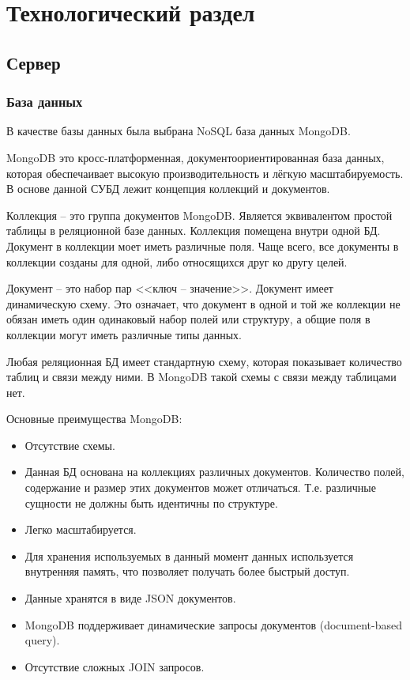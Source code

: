 \chapter{Технологический раздел}

\section{Сервер}

\subsection{База данных}
В качестве базы данных была выбрана NoSQL база данных MongoDB.

MongoDB это кросс-платформенная, документоориентированная база данных, которая обеспечаивает высокую производительность и лёгкую масштабируемость. В основе данной СУБД лежит концепция коллекций и документов.

Коллекция – это группа документов MongoDB. Является эквивалентом простой таблицы в реляционной базе данных. Коллекция помещена внутри одной БД. Документ в коллекции моет иметь различные поля. Чаще всего, все документы в коллекции созданы для одной, либо относящихся друг ко другу целей.

Документ – это набор пар <<ключ – значение>>. Документ имеет динамическую схему. Это означает, что документ в одной и той же коллекции не обязан иметь один одинаковый набор полей или структуру, а общие поля в коллекции могут иметь различные типы данных.

Любая реляционная БД имеет стандартную схему, которая показывает количество таблиц и связи между ними. В MongoDB такой схемы с связи между таблицами нет.

Основные преимущества MongoDB:

\begin{itemize}
	\item Отсутствие схемы.
	\item Данная БД основана на коллекциях различных документов. Количество полей, содержание и размер этих документов может отличаться. Т.е. различные сущности не должны быть идентичны по структуре.
	\item Легко масштабируется.
	\item Для хранения используемых в данный момент данных используется внутренняя память, что позволяет получать более быстрый доступ.
	\item Данные хранятся в виде JSON документов.
	\item MongoDB поддерживает динамические запросы документов (document-based query).
	\item Отсутствие сложных JOIN запросов.
\end{itemize}

